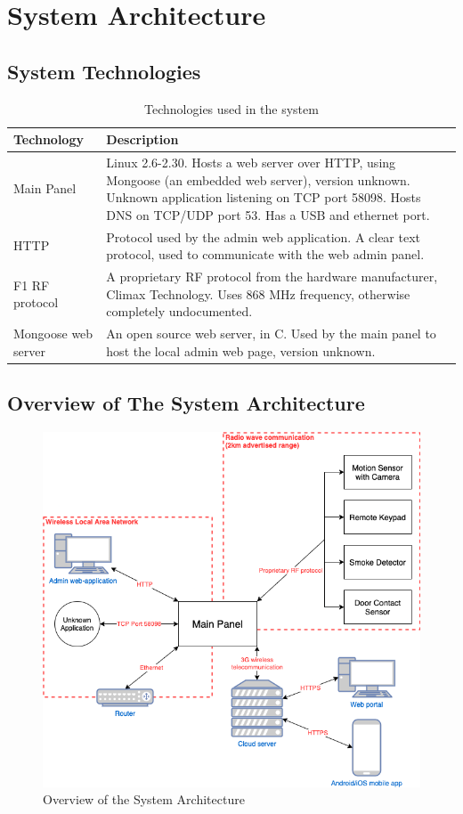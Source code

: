 \section{System Architecture}

\subsection{System Technologies}
\begin{table}[!ht]
    \centering
    \begin{tabularx}{\textwidth}{l X}
        \textbf{Technology}  & \textbf{Description} \\
        \hline
        Main Panel & Linux 2.6-2.30. Hosts a web server over HTTP, using Mongoose (an embedded web server), version unknown. Unknown application listening on TCP port 58098. Hosts DNS on TCP/UDP port 53. Has a USB and ethernet port. \\
        \hline
        HTTP  & Protocol used by the admin web application. A clear text protocol, used to communicate with the web admin panel. \\
        \hline
        F1 RF protocol  & A proprietary \gls{RF} protocol from the hardware manufacturer, Climax Technology. Uses 868 MHz frequency, otherwise completely undocumented. \\
        \hline
        Mongoose web server  & An open source web server, in C. Used by the main panel to host the local admin web page, version unknown. \\
        \hline
    \end{tabularx}
    \caption{Technologies used in the system}
    \label{tb:system-technologies}
\end{table}

\subsection{Overview of The System Architecture}
\begin{figure}[!ht]
    \centering
    \includegraphics[width=\textwidth]{images/system-overview.png}
    \caption{Overview of the System Architecture}
    \label{fig:system-overview}
\end{figure}
